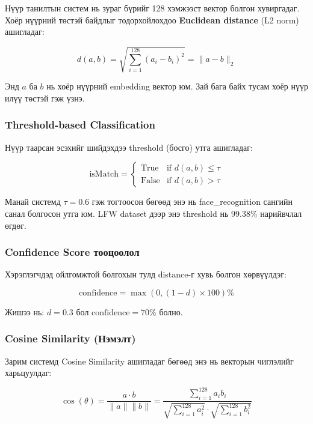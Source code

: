 \documentclass[12pt,a4paper]{article}
\begin{document}
Нүүр танилтын систем нь зураг бүрийг 128 хэмжээст вектор болгон хувиргадаг. Хоёр нүүрний төстэй байдлыг тодорхойлохдоо \textbf{Euclidean distance} (L2 norm) ашигладаг:

\begin{equation}
d(a, b) = \sqrt{\sum_{i=1}^{128} (a_i - b_i)^2} = \|a - b\|_2
\end{equation}

Энд $a$ ба $b$ нь хоёр нүүрний embedding вектор юм. Зай бага байх тусам хоёр нүүр илүү төстэй гэж үзнэ.

\subsubsection{Threshold-based Classification}

Нүүр таарсан эсэхийг шийдэхдээ threshold (босго) утга ашигладаг:

\begin{equation}
\text{isMatch} = 
\begin{cases}
\text{True} & \text{if } d(a, b) \leq \tau \\
\text{False} & \text{if } d(a, b) > \tau
\end{cases}
\end{equation}

Манай системд $\tau = 0.6$ гэж тогтоосон бөгөөд энэ нь face\_recognition сангийн санал болгосон утга юм. LFW dataset дээр энэ threshold нь 99.38\% нарийвчлал өгдөг.

\subsubsection{Confidence Score тооцоолол}

Хэрэглэгчдэд ойлгомжтой болгохын тулд distance-г хувь болгон хөрвүүлдэг:

\begin{equation}
\text{confidence} = \max(0, (1 - d) \times 100)\%
\end{equation}

Жишээ нь: $d = 0.3$ бол $\text{confidence} = 70\%$ болно.

\subsubsection{Cosine Similarity (Нэмэлт)}

Зарим системд Cosine Similarity ашигладаг бөгөөд энэ нь векторын чиглэлийг харьцуулдаг:

\begin{equation}
\cos(\theta) = \frac{a \cdot b}{\|a\| \|b\|} = \frac{\sum_{i=1}^{128} a_i b_i}{\sqrt{\sum_{i=1}^{128} a_i^2} \cdot \sqrt{\sum_{i=1}^{128} b_i^2}}
\end{equation}
\end{document}
